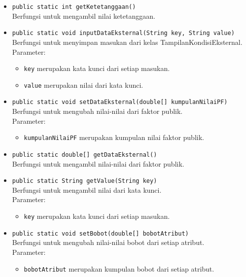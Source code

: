 \begin{itemize}
		\item \texttt{public static int getKetetanggaan()}\\
		Berfungsi untuk mengambil nilai ketetanggaan.
		
		\item \texttt{public static void inputDataEksternal(String key, String value)}\\
		Berfungsi untuk menyimpan masukan dari kelas TampilanKondisiEksternal.\\
		Parameter:
		\begin{itemize}
			\item \texttt{key} merupakan kata kunci dari setiap masukan.
			\item \texttt{value} merupakan nilai dari kata kunci.
		\end{itemize}
		
		\item \texttt{public static void setDataEksternal(double[] kumpulanNilaiPF)}\\
		Berfungsi untuk mengubah nilai-nilai dari faktor publik.\\
		Parameter:
		\begin{itemize}
			\item \texttt{kumpulanNilaiPF} merupakan kumpulan nilai faktor publik.
		\end{itemize}
		
		\item \texttt{public static double[] getDataEksternal()}\\
		Berfungsi untuk mengambil nilai-nilai dari faktor publik.
		
		\item \texttt{public static String getValue(String key)}\\
		Berfungsi untuk mengambil nilai dari kata kunci.\\
		Parameter:
		\begin{itemize}
			\item \texttt{key} merupakan kata kunci dari setiap masukan.
		\end{itemize}
		
		\item \texttt{public static void setBobot(double[] bobotAtribut)}\\
		Berfungsi untuk mengubah nilai-nilai bobot dari setiap atribut.\\
		Parameter:
		\begin{itemize}
			\item \texttt{bobotAtribut} merupakan kumpulan bobot dari setiap atribut.
		\end{itemize}
		

\end{itemize}

